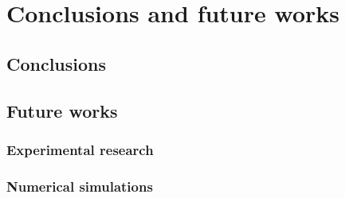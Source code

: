 \chapter{Conclusions and future works}
\label{cap:conclus}

\section{Conclusions}

\section{Future works}

\subsection{Experimental research}

\subsection{Numerical simulations}